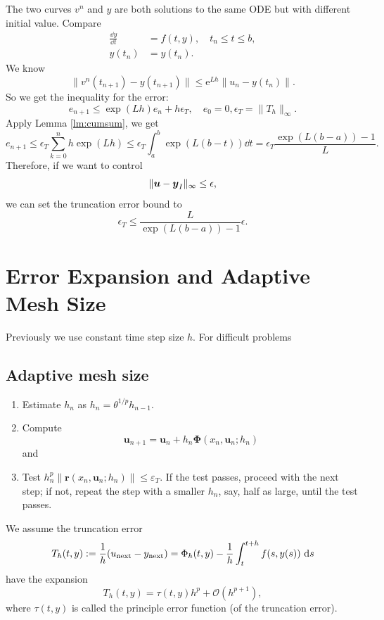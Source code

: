 \documentclass[10pt]{amsart}
\begin{document}
The two curves $v^n$ and $y$ are both solutions to the same ODE but with different initial value. Compare 
\begin{equation}
\begin{aligned}
\frac{\dd y}{\dd t} &= f(t, y), \quad t_n \leq t \leq b, \\
y(t_n) &= y(t_n).
\end{aligned}
\end{equation}
We know
$$
\|v^n(t_{n+1}) - y(t_{n+1})\| \leq \mathrm{e}^{Lh}\left\|u_n - y(t_n)\right\|.
$$
So we get the inequality for the error:
$$
e_{n+1}\leq \exp(Lh) e_n + h \epsilon_T,  \quad e_0 = 0, \epsilon_T = \|T_h\|_{\infty}.
$$
Apply Lemma \ref{lm:cumsum}, we get
$$
e_{n+1}\leq \epsilon_T \sum_{k=0}^n h \exp(Lh)\leq \epsilon_T \int_a^b \exp (L(b-t))\dd t = \epsilon_T \frac{ \exp (L(b-a))-1}{L}.
$$
Therefore, if we want to control 
$$
\| \boldsymbol u - \boldsymbol y_I\|_{\infty} \leq \epsilon,
$$
we can set the truncation error bound to 
\begin{equation}
 \epsilon_T \leq \frac{L}{ \exp (L(b-a))-1} \epsilon.
\end{equation}



\section{Error Expansion and Adaptive Mesh Size}
Previously we use constant time step size $h$. For difficult problems 
\subsection{Adaptive mesh size}
\begin{enumerate}
 \item Estimate $h_n$ as $h_n = \theta^{1/p}h_{n-1}$.
\item Compute 
$$\boldsymbol{u}_{n+1}=\boldsymbol{u}_n+h_n \boldsymbol{\Phi}\left(x_n, \boldsymbol{u}_n ; h_n\right)$$ and 
\item Test $h_n^p\left\|\boldsymbol{r}\left(x_n, \boldsymbol{u}_n ; h_n\right)\right\| \leq \varepsilon_T$. If the test passes, proceed with the next step; if not, repeat the step with a smaller $h_n$, say, half as large, until the test passes.
\end{enumerate}



We assume the truncation error
\begin{equation}\label{eq:Tphi}  
T_h(t, y) := \frac{1}{h}(u_{\rm next} - y_{\rm next}) =  \Phi_h(t, y) - \frac{1}{h} \int_{t}^{t+h} f(s, y(s)) \, \,{\rm d} s
\end{equation}  
have the expansion
$$
T_h(t, y) = \tau(t, y) h^p + \mathcal O(h^{p+1}),
$$
where $\tau(t,y)$ is called the principle error function (of the truncation error). 
\end{document}
